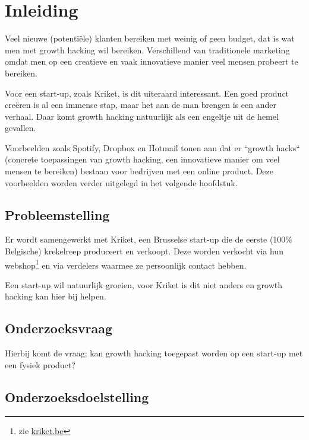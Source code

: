 
\chapter{Inleiding}
\label{ch:inleiding}

Veel nieuwe (potentiële) klanten bereiken met weinig of geen budget, dat is wat men met growth hacking wil bereiken. Verschillend van traditionele marketing omdat men op een creatieve en vaak innovatieve manier veel mensen probeert te bereiken. 

Voor een start-up, zoals Kriket, is dit uiteraard interessant. Een goed product creëren is al een immense stap, maar het aan de man brengen is een ander verhaal. Daar komt growth hacking natuurlijk als een engeltje uit de hemel gevallen. 

Voorbeelden zoals Spotify, Dropbox en Hotmail tonen aan dat er ``growth hacks`` (concrete toepassingen van growth hacking, een innovatieve manier om veel mensen te bereiken) bestaan voor bedrijven met een online product. Deze voorbeelden worden verder uitgelegd in het volgende hoofdstuk.

\section{Probleemstelling}
\label{sec:probleemstelling}

Er wordt samengewerkt met Kriket, een Brusselse start-up die de eerste (100\% Belgische) krekelreep produceert en verkoopt. Deze worden verkocht via hun webshop\footnote{zie \href{https://kriket.be}{kriket.be}} en via verdelers waarmee ze persoonlijk contact hebben.

Een start-up wil natuurlijk groeien, voor Kriket is dit niet anders en growth hacking kan hier bij helpen.

\section{Onderzoeksvraag}
\label{sec:onderzoeksvraag}

Hierbij komt de vraag; kan growth hacking toegepast worden op een start-up met een fysiek product?

\section{Onderzoeksdoelstelling}
\label{sec:onderzoeksdoelstelling}

